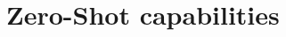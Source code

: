 \documentclass[a4paper, oneside, english]{sapthesis} %
\begin{document}

\section{Zero-Shot capabilities}
\end{document}
